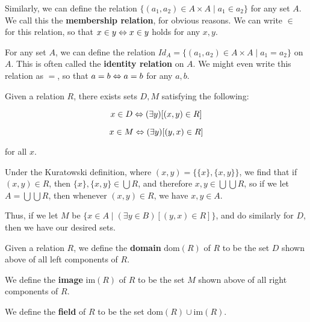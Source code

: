 \begin{example} 
\label{Example:_membership_relation}
Similarly, we can define the relation $\{(a_1, a_2)\in A\times A\mid a_1 \in a_2\}$ for any set $A$. We call this the \textbf{membership relation}, for obvious reasons. We can write $\in$ for this relation, so that $x\in y \Leftrightarrow x\in y$ holds for any $x, y$.
\end{example}

\begin{example} 
\label{Example:_identity_relation}
For any set $A$, we can define the relation $Id_A=\{(a_1, a_2)\in A\times A\mid a_1 = a_2\}$ on $A$. This is often called the \textbf{identity relation} on $A$. We might even write this relation as $=$, so that $a=b\Leftrightarrow a=b$ for any $a, b$.
\end{example}

\begin{thm}
\label{Thm:_Domains_and_Images_of_relations}
Given a relation $R$, there exists sets $D, M$ satisfying the following: 

$$x\in D \Leftrightarrow (\exists y)[(x, y)\in R]$$ 

$$x\in M \Leftrightarrow (\exists y)[(y, x)\in R]$$

for all $x$. 
\end{thm}

\begin{prf}
Under the Kuratowski definition, where $(x, y) = \{\{x\}, \{x, y\}\}$, we find that if $(x, y)\in R$, then $\{x\}, \{x, y\}\in\bigcup R$, and therefore $x, y \in \bigcup\bigcup R$, so if we let $A=\bigcup\bigcup R$, then whenever $(x, y)\in R$, we have $x, y \in A$. 

Thus, if we let $M$ be $\{x\in A\mid (\exists y\in B)[(y, x)\in R]\}$, and do similarly for $D$, then we have our desired sets.
\end{prf}

\begin{defn}
\label{Defn:_Domains_and_Images_of_relations}
Given a relation $R$, we define the \textbf{domain} $\text{dom}(R)$ of $R$ to be the set $D$ shown above of all left components of $R$.

We define the \textbf{image} $\text{im}(R)$ of $R$ to be the set $M$ shown above of all right components of $R$. 

We define the \textbf{field} of $R$ to be the set $\text{dom}(R)\cup \text{im}(R)$.
\end{defn}

